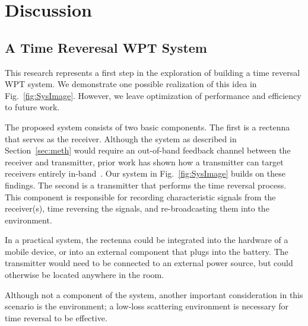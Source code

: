 \section{Discussion}
\label{sec:discussion}

\subsection{A Time Reveresal WPT System}
\label{sec:system}

This research represents a first step in the exploration of building a
time reversal WPT system.
%
We demonstrate one possible realization of this idea in Fig.~\ref{fig:SysImage}.
%
However, we leave optimization of performance and efficiency to future work.


The proposed system consists of two basic components.
%
The first is a rectenna that serves as the receiver.
%
Although the system as described in Section~\ref{sec:meth} would require an
out-of-band feedback channel between the receiver and transmitter, prior work
has shown how a transmitter can target receivers entirely
in-band~\cite{nltr-wave-chaotic,roman}.
%
Our system in Fig.~\ref{fig:SysImage} builds on these findings.
%
The second is a transmitter that performs the time reversal process.
%
This component is responsible for recording characteristic signals from the
receiver(s), time reversing the signals, and re-broadcasting them into the
environment.



In a practical system, the rectenna could be integrated into the hardware of a
mobile device, or into an external component that plugs into the battery.
%
The transmitter would need to be connected to an external power source, but
could otherwise be located anywhere in the room.


Although not a component of the system, another important consideration in this
scenario is the environment; a low-loss scattering environment is necessary for
time reversal to be effective.

